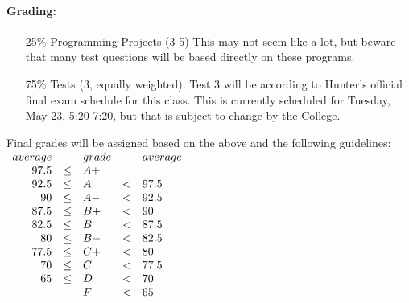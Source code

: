 \documentclass[10pt]{article}
\begin{document}
\paragraph*{\bf Grading:} 
  \begin{itemize}
  \item[25\%] Programming Projects (3-5)
    This may not seem like a lot, but beware that many test questions
    will be based directly on these programs.  
  \item[75\%] Tests (3, equally weighted). 
    Test 3 will be according to Hunter's official final exam
    schedule for this class. This is currently scheduled for Tuesday, May 23,
    5:20-7:20, but that is subject to change by the College. 
  \end{itemize}
  Final grades will be assigned based on the above and the following
  guidelines:\\
$
  \begin{array}{rclcl}
    average&&grade&&average\\
    97.5 & \leq & A+ &  &  \\
    92.5 & \leq & A & < & 97.5 \\
    90 & \leq & A- & < & 92.5\\
    87.5 & \leq & B+ & < & 90 \\
    82.5 & \leq & B & < & 87.5 \\
    80 & \leq & B- & < & 82.5 \\
    77.5 & \leq & C+ & < & 80 \\
    70 & \leq & C & < & 77.5 \\
    65 & \leq & D & < & 70 \\
       &      & F & < & 65
   \end{array}\\$
\end{document}
